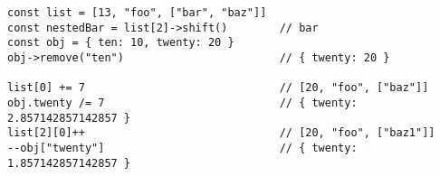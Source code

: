\vspace{-2.25em}
\begin{center}
\begin{minipage}[t]{1\textwidth}
\begin{listing}[H]
\begin{spacing}{0.6}
\begin{verbatim}
const list = [13, "foo", ["bar", "baz"]]
const nestedBar = list[2]->shift()        // bar
const obj = { ten: 10, twenty: 20 }
obj->remove("ten")                        // { twenty: 20 }

list[0] += 7                              // [20, "foo", ["baz"]]
obj.twenty /= 7                           // { twenty: 2.857142857142857 }
list[2][0]++                              // [20, "foo", ["baz1"]]
--obj["twenty"]                           // { twenty: 1.857142857142857 }
\end{verbatim}
\end{spacing}
\end{listing}
\end{minipage}
\end{center}
